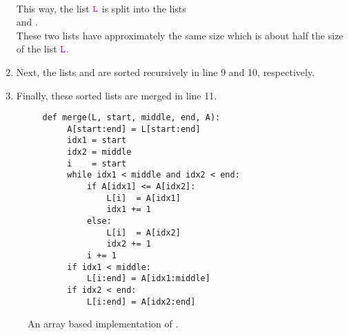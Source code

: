 \begin{enumerate}
      \hspace*{1.3cm} 
      \\[0.2cm]
      This way, the list $\mytt{L}$ is split into the lists 
      \\[0.2cm]
      \hspace*{1.3cm}
       \quad and \quad {}.
      \\[0.2cm]
      These two lists have approximately the same size which is about half the size of the list $\mytt{L}$.
\item Next, the lists  and  are sorted
      recursively in line 9 and 10, respectively.
\item Finally, these sorted lists are merged in line 11.
\end{enumerate}

\begin{figure}[!ht]
  \centering
\begin{verbatim}
   def merge(L, start, middle, end, A):
        A[start:end] = L[start:end]
        idx1 = start
        idx2 = middle
        i    = start
        while idx1 < middle and idx2 < end:
            if A[idx1] <= A[idx2]:
                L[i]  = A[idx1]
                idx1 += 1
            else:
                L[i]  = A[idx2]
                idx2 += 1
            i += 1
        if idx1 < middle:
            L[i:end] = A[idx1:middle]
        if idx2 < end:
            L[i:end] = A[idx2:end]
\end{verbatim}
\vspace*{-0.3cm}
  \caption{An array based implementation of .}
  \label{fig:merge-sort-array.stlx-merge}
\end{figure}

